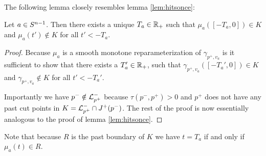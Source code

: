 

The following lemma closely resembles lemma \ref{lem:hitsonce}:
\begin{lemma}\label{lem:Tvdef}
    Let $a\in {S^{n-1}}$.
    Then there exists a unique $T_a\in \mathbb{R}_+$ such that $\mu_a([-T_a,0])\in K$ and $\mu_a(t')\notin K$ for all $t'<-T_a$.
\end{lemma}
\begin{proof}
    Because $\mu_a$ is a smooth monotone reparameterization of $\gamma_{p^+,v_a}$ is it sufficient to show that there exists a $T_a'\in \mathbb{R}_+$, such that $\gamma_{p^+,v_a}([-T_a',0])\in K$ and $\gamma_{p^+,v_a}\notin K$ for all $t'<-T_a'$.

    Importantly we have $p^-\notin {\mathcal{L}}^-_{p^+}$ because $\tau(p^-,p^+)>0$ and $p^+$ does not have any past cut points in $K={\mathcal{L}}^-_{p^+}\cap J^+(p^-)$. The rest of the proof is now essentially analogous to the proof of lemma \ref{lem:hitsonce}.
\end{proof}
Note that because $R$ is the past boundary of $K$ we have $t=T_a$ if and only if $\mu_a(t)\in R$.

